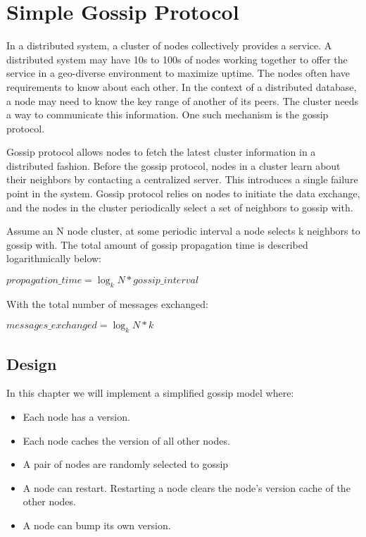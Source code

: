 % 


\chapter{Simple Gossip Protocol}

In a distributed system, a cluster of nodes collectively provides a service. A
distributed system may have 10s to 100s of nodes working together to offer the
service in a geo-diverse environment to maximize uptime. The nodes often
have requirements to know about each other. In the context of a distributed
database, a node may need to know the key range of another of its peers. The
cluster needs a way to communicate this information. One such mechanism is the
gossip protocol.\newline

Gossip protocol allows nodes to fetch the latest cluster information in a
distributed fashion. Before the gossip protocol, nodes in a cluster learn about
their neighbors by contacting a centralized server. This introduces a single
failure point in the system. Gossip protocol relies on nodes to initiate
the data exchange, and the nodes in the cluster periodically select a set of neighbors to
gossip with. \newline

Assume an N node cluster, at some periodic interval a node selects k neighbors
to gossip with. The total amount of gossip propagation time is described
logarithmically below:

\begin{center}
$propagation\_time = \log_k N * gossip\_interval$
\end{center}

With the total number of messages exchanged:
\begin{center}
$messages\_exchanged = \log_k N * k$
\end{center}

\section{Design}

In this chapter we will implement a simplified gossip model where: 
\begin{itemize}
    \item Each node has a version.
    \item Each node caches the version of all other nodes.
    \item A pair of nodes are randomly selected to gossip 
    \item A node can restart. Restarting a node clears the node's version cache
    of the other nodes.
    \item A node can bump its own version.
\end{itemize}

